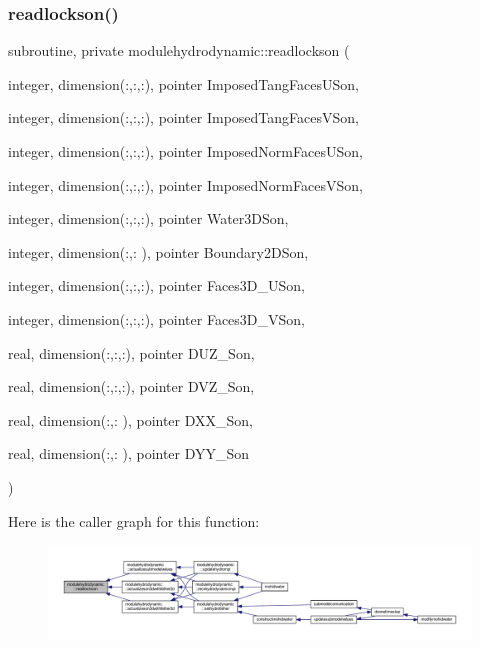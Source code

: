\subsubsection{\texorpdfstring{readlockson()}{readlockson()}}
{\footnotesize\ttfamily subroutine, private modulehydrodynamic\+::readlockson (\begin{DoxyParamCaption}\item[{integer, dimension(\+:,\+:,\+:), pointer}]{Imposed\+Tang\+Faces\+U\+Son,  }\item[{integer, dimension(\+:,\+:,\+:), pointer}]{Imposed\+Tang\+Faces\+V\+Son,  }\item[{integer, dimension(\+:,\+:,\+:), pointer}]{Imposed\+Norm\+Faces\+U\+Son,  }\item[{integer, dimension(\+:,\+:,\+:), pointer}]{Imposed\+Norm\+Faces\+V\+Son,  }\item[{integer, dimension(\+:,\+:,\+:), pointer}]{Water3\+D\+Son,  }\item[{integer, dimension(\+:,\+:  ), pointer}]{Boundary2\+D\+Son,  }\item[{integer, dimension(\+:,\+:,\+:), pointer}]{Faces3\+D\+\_\+\+U\+Son,  }\item[{integer, dimension(\+:,\+:,\+:), pointer}]{Faces3\+D\+\_\+\+V\+Son,  }\item[{real, dimension(\+:,\+:,\+:), pointer}]{D\+U\+Z\+\_\+\+Son,  }\item[{real, dimension(\+:,\+:,\+:), pointer}]{D\+V\+Z\+\_\+\+Son,  }\item[{real, dimension(\+:,\+:  ), pointer}]{D\+X\+X\+\_\+\+Son,  }\item[{real, dimension(\+:,\+:  ), pointer}]{D\+Y\+Y\+\_\+\+Son }\end{DoxyParamCaption})\hspace{0.3cm}{\ttfamily [private]}}

Here is the caller graph for this function\+:\nopagebreak
\begin{figure}[H]
\begin{center}
\leavevmode
\includegraphics[width=350pt]{namespacemodulehydrodynamic_ad125ca32b530446bb6be8cbf582f792e_icgraph}
\end{center}
\end{figure}
\mbox{\label{namespacemodulehydrodynamic_af6d2413608971031e8650e99548abfc7}} 
